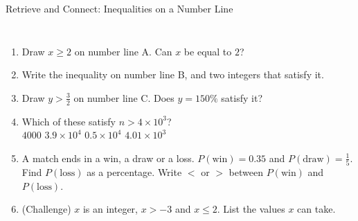 \documentclass{beamer}
\newcommand{\ashow}[1]{\uncover<2->{\textcolor{red}{\small #1}}}
\newcommand{\tightlist}{%
  \setlength{\itemsep}{0pt}\setlength{\parskip}{0pt}\setlength{\topsep}{0pt}%
}
\begin{document}
\begin{frame}[t]{Retrieve and Connect: Inequalities on a Number Line}
\begin{columns}[T,onlytextwidth]
\vspace{-1.5em}
\footnotesize
\begin{enumerate}\tightlist
{}
  \item Draw $x\geq2$ on number line A. Can $x$ be equal to $2$?
        \ashow{Yes: $\geq$ includes $2$, so the circle is filled.}
  \item Write the inequality on number line B, and two integers that satisfy it.
        \ashow{$x<-1$; \; for example $-2$ and $-3$}
  \item Draw $y>\frac32$ on number line C. Does $y=150\%$ satisfy it?
        \ashow{No: $150\%=\tfrac32$, not more than $\tfrac32$.}
  \item Which of these satisfy $n>4\times10^3$?\\[1pt]
        \hspace*{1em}$4000$ \quad $3.9\times10^4$ \quad $0.5\times10^4$ \quad $4.01\times10^3$\\
        \ashow{All except $4000$, which equals $4\times10^3$}
  \item A match ends in a win, a draw or a loss. $P(\text{win})=0.35$ and
        $P(\text{draw})=\frac15$. Find $P(\text{loss})$ as a percentage. Write $<$ or $>$
        between $P(\text{win})$ and $P(\text{loss})$.
        \ashow{$45\%$, so $P(\text{win})<P(\text{loss})$}
  \item (Challenge) $x$ is an integer, $x>-3$ and $x\leq2$. List the values $x$ can take.
        \ashow{$-2,\ -1,\ 0,\ 1,\ 2$}
\end{enumerate}
\end{columns}
\end{frame}
\end{document}
